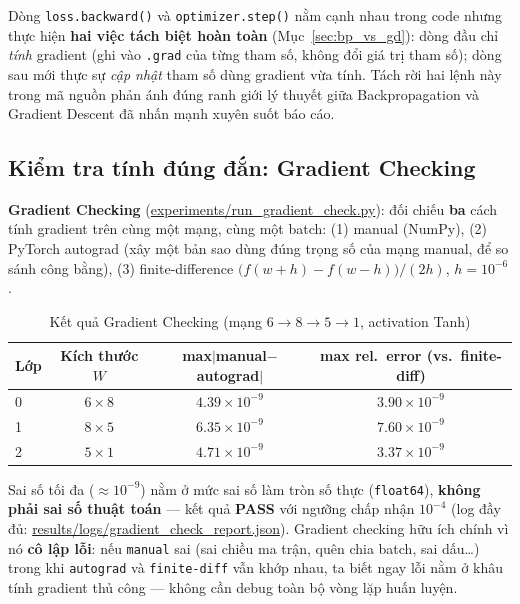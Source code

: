 \documentclass[12pt,a4paper]{article}
\begin{document}
Dòng \texttt{loss.backward()} và \texttt{optimizer.step()} nằm cạnh nhau
trong code nhưng thực hiện \textbf{hai việc tách biệt hoàn toàn}
(Mục~\ref{sec:bp_vs_gd}): dòng đầu chỉ \emph{tính} gradient (ghi vào
\texttt{.grad} của từng tham số, không đổi giá trị tham số); dòng sau mới
thực sự \emph{cập nhật} tham số dùng gradient vừa tính. Tách rời hai lệnh
này trong mã nguồn phản ánh đúng ranh giới lý thuyết giữa Backpropagation
và Gradient Descent đã nhấn mạnh xuyên suốt báo cáo.

\subsection{Kiểm tra tính đúng đắn: Gradient Checking}

\textbf{Gradient Checking} (\url{experiments/run_gradient_check.py}):
đối chiếu \textbf{ba} cách tính gradient trên cùng một mạng, cùng một
batch: (1) manual (NumPy), (2) PyTorch autograd (xây một bản sao dùng đúng
trọng số của mạng manual, để so sánh công bằng), (3) finite-difference
$\big(f(w+h)-f(w-h)\big)/(2h)$, $h=10^{-6}$.

\begin{table}[htbp]
\centering
\caption{Kết quả Gradient Checking (mạng $6\to8\to5\to1$, activation Tanh)}
\begin{tabular}{@{}lccc@{}}
\toprule
Lớp & Kích thước $W$ & max$|$manual$-$autograd$|$ & max rel.\ error (vs.\ finite-diff) \\
\midrule
0 & $6\times8$ & $4.39\times10^{-9}$ & $3.90\times10^{-9}$ \\
1 & $8\times5$ & $6.35\times10^{-9}$ & $7.60\times10^{-9}$ \\
2 & $5\times1$ & $4.71\times10^{-9}$ & $3.37\times10^{-9}$ \\
\bottomrule
\end{tabular}
\label{tab:gradcheck}
\end{table}
\label{sec:gradcheck}

Sai số tối đa ($\approx10^{-9}$) nằm ở mức sai số làm tròn số thực
(\texttt{float64}), \textbf{không phải sai số thuật toán} --- kết quả
\textbf{PASS} với ngưỡng chấp nhận $10^{-4}$ (log đầy đủ:
\url{results/logs/gradient_check_report.json}). Gradient checking hữu
ích chính vì nó \textbf{cô lập lỗi}: nếu \texttt{manual} sai (sai chiều ma
trận, quên chia batch, sai dấu\ldots) trong khi \texttt{autograd} và
\texttt{finite-diff} vẫn khớp nhau, ta biết ngay lỗi nằm ở khâu tính
gradient thủ công --- không cần debug toàn bộ vòng lặp huấn luyện.
\end{document}
